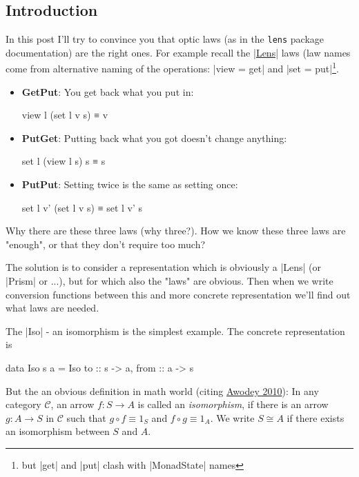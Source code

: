 \documentclass{article}
\begin{document}
\subsection{Introduction}

In this post I'll try to convince you that optic laws (as in the \texttt{lens} package
documentation) are the right ones. For example recall the \href{http://hackage.haskell.org/package/lens-4.17/docs/Control-Lens-Lens.html#t:Lens}{|Lens|} laws
(law names come from alternative naming of the operations: |view = get| and |set = put|\footnote{but |get| and |put| clash with |MonadState| names}.

\begin{itemize}
\item \textbf{GetPut}: You get back what you put in:

\begin{code}
view l (set l v s) ≡ v
\end{code}

\item \textbf{PutGet}: Putting back what you got doesn't change anything:

\begin{code}
set l (view l s) s ≡ s
\end{code}

\item \textbf{PutPut}: Setting twice is the same as setting once:

\begin{code}
set l v' (set l v s) ≡ set l v' s
\end{code}
\end{itemize}

Why there are these three laws (why three?).
How we know these three laws are "enough",
or that they don't require too much?

The solution is to consider a representation which is obviously a |Lens| (or |Prism| or ...),
but for which also the "laws" are obvious. Then when we write conversion functions
between this and more concrete representation we'll find out what laws are needed.

The |Iso| - an isomorphism is the simplest example.
The concrete representation is

\begin{code}
data Iso s a = Iso { to :: s -> a, from :: a -> s }
\end{code}

But the an obvious definition in math world (citing \href{https://global.oup.com/academic/product/category-theory-9780199237180}{Awodey 2010}):
In any category $\mathcal{C}$, an arrow $f : S \to A$ is called an \emph{isomorphism},
if there is an arrow $g : A \to S$ in $\mathcal{C}$ such that
$g \circ f \equiv 1_S$ and $f \circ g \equiv 1_A$.
We write $S \cong A$ if there exists an isomorphism between $S$ and $A$.
\end{document}

